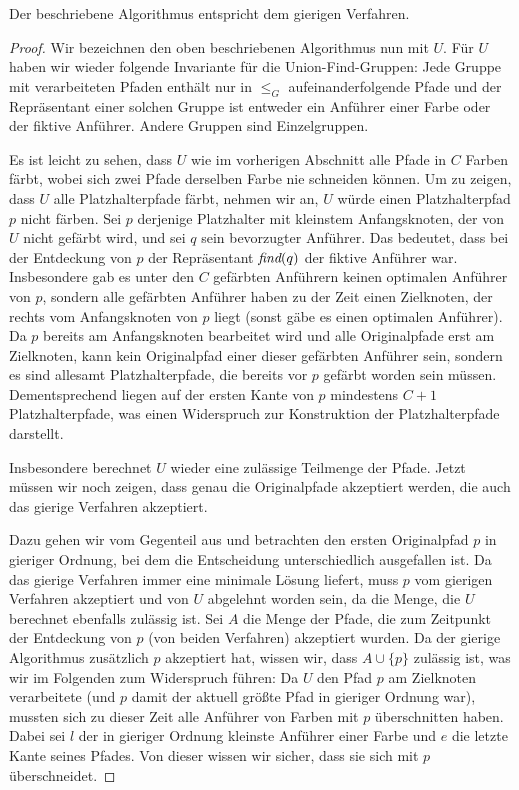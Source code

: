 \begin{lemma}
    Der beschriebene Algorithmus entspricht dem gierigen Verfahren.
\end{lemma}
\begin{proof}
    Wir bezeichnen den oben beschriebenen Algorithmus nun mit $U$.
    Für $U$ haben wir wieder folgende Invariante für die Union-Find-Gruppen:
    Jede Gruppe mit verarbeiteten Pfaden enthält nur in $\leq_G$ aufeinanderfolgende Pfade und der Repräsentant einer
    solchen Gruppe ist entweder ein Anführer einer Farbe oder der fiktive Anführer.
    Andere Gruppen sind Einzelgruppen.

    Es ist leicht zu sehen, dass $U$ wie im vorherigen Abschnitt alle Pfade in $C$ Farben färbt, wobei sich zwei Pfade
    derselben Farbe nie schneiden können.
    Um zu zeigen, dass $U$ alle Platzhalterpfade färbt, nehmen wir an, $U$ würde einen Platzhalterpfad $p$ nicht färben.
    Sei $p$ derjenige Platzhalter mit kleinstem Anfangsknoten, der von $U$ nicht gefärbt wird, und sei $q$ sein bevorzugter Anführer.
    Das bedeutet, dass bei der Entdeckung von $p$ der Repräsentant $\text{\em find}(q)$ der fiktive Anführer war.
    Insbesondere gab es unter den $C$ gefärbten Anführern keinen optimalen Anführer von $p$, sondern alle gefärbten Anführer
    haben zu der Zeit einen Zielknoten, der rechts vom Anfangsknoten von $p$ liegt (sonst gäbe es einen optimalen Anführer).
    Da $p$ bereits am Anfangsknoten bearbeitet wird und alle Originalpfade erst am Zielknoten, kann kein Originalpfad einer
    dieser gefärbten Anführer sein, sondern es sind allesamt Platzhalterpfade, die bereits vor $p$ gefärbt worden sein müssen.
    Dementsprechend liegen auf der ersten Kante von $p$ mindestens $C+1$ Platzhalterpfade, was einen Widerspruch zur Konstruktion
    der Platzhalterpfade darstellt.

    Insbesondere berechnet $U$ wieder eine zulässige Teilmenge der Pfade.
    Jetzt müssen wir noch zeigen, dass genau die Originalpfade akzeptiert werden, die auch das gierige Verfahren
    akzeptiert.

    Dazu gehen wir vom Gegenteil aus und betrachten den ersten Originalpfad $p$ in gieriger Ordnung, bei dem die
    Entscheidung unterschiedlich ausgefallen ist.
    Da das gierige Verfahren immer eine minimale Lösung liefert, muss $p$ vom gierigen Verfahren akzeptiert und von
    $U$ abgelehnt worden sein, da die Menge, die $U$ berechnet ebenfalls zulässig ist.
    Sei $A$ die Menge der Pfade, die zum Zeitpunkt der Entdeckung von $p$ (von beiden Verfahren) akzeptiert wurden.
    Da der gierige Algorithmus zusätzlich $p$ akzeptiert hat, wissen wir, dass $A \cup \{p\}$ zulässig ist, was wir
    im Folgenden zum Widerspruch führen:
    Da $U$ den Pfad $p$ am Zielknoten verarbeitete (und $p$ damit der aktuell größte Pfad in gieriger Ordnung
    war), mussten sich zu dieser Zeit alle Anführer von Farben mit $p$ überschnitten haben.
    Dabei sei $l$ der in gieriger Ordnung kleinste Anführer einer Farbe und $e$ die letzte Kante seines Pfades.
    Von dieser wissen wir sicher, dass sie sich mit $p$ überschneidet.


\end{proof}
